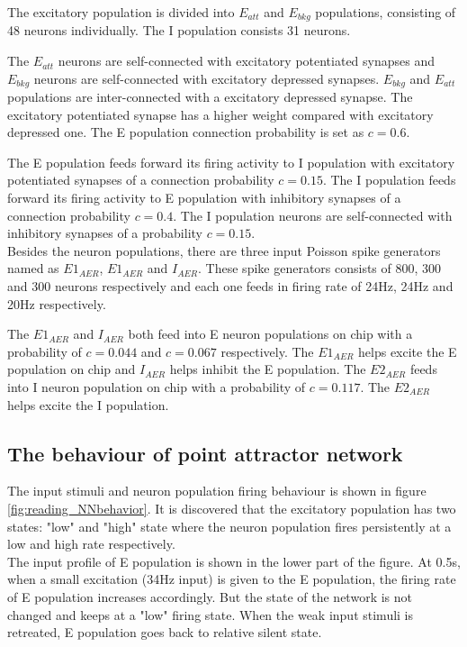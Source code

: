 The excitatory population is divided into $E_{att}$ and $E_{bkg}$ populations, consisting of 48 neurons individually. The I population consists 31 neurons. 

The $E_{att}$ neurons are self-connected with excitatory potentiated synapses and $E_{bkg}$ neurons are self-connected with excitatory depressed synapses. $E_{bkg}$ and $E_{att}$ populations are inter-connected with a excitatory depressed synapse.
The excitatory potentiated synapse has a higher weight compared with excitatory depressed one. The E population connection probability is set as $c=0.6$.

The E population feeds forward its firing activity to I population with excitatory potentiated synapses of a connection probability $c=0.15$. The I population feeds forward its firing activity to E population with inhibitory synapses of a connection probability $c=0.4$. The I population neurons are self-connected with inhibitory synapses of a probability $c=0.15$.\\

Besides the neuron populations, there are three input Poisson spike generators named as $E1_{AER}$, $E1_{AER}$ and $I_{AER}$.
These spike generators consists of 800, 300 and 300 neurons respectively and each one feeds in firing rate of 24Hz, 24Hz and 20Hz respectively.

The $E1_{AER}$ and $I_{AER}$ both feed into E neuron populations on chip with a probability of $c=0.044$ and $c=0.067$ respectively. The $E1_{AER}$ helps excite the E population on chip and $I_{AER}$ helps inhibit the E population.
The $E2_{AER}$ feeds into I neuron population on chip with a probability of $c=0.117$. The $E2_{AER}$ helps excite the I population.

\subsection{The behaviour of point attractor network}
The input stimuli and neuron population firing behaviour is shown in figure \ref{fig:reading_NNbehavior}. It is discovered that the excitatory population has two states: "low" and "high" state where the neuron population fires persistently at a low and high rate respectively.\\

The input profile of E population is shown in the lower part of the figure.
At 0.5s, when a small excitation (34Hz input) is given to the E population, the firing rate of E population increases accordingly. But the state of the network is not changed and keeps at a "low" firing state. When the weak input stimuli is retreated, E population goes back to relative silent state.\\

